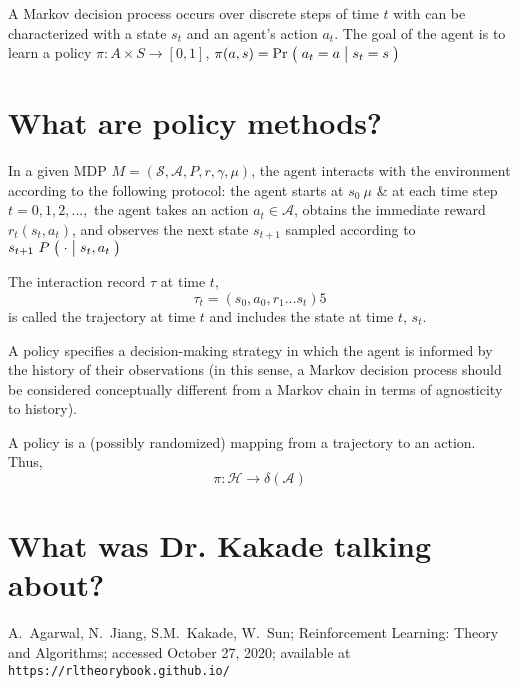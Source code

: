 \documentclass[12pt,reqno]{amsart}
\newcommand{\Cond}[2]{\bigm( {#1} \bigm\vert {#2}\bigm)}
\begin{document}
A Markov decision process occurs over discrete steps of time $t$ with can be characterized with a state $s_{t}$ and an agent's action $a_{t}$. The goal of the agent is to learn a policy $\pi: A \times S \rightarrow [0,1]$, $ \pi(a,s) = \Pr\Cond{a_{t} = a}{s_{t} = s} $
\section{What are policy methods?}
In a given MDP $M = (\mathcal{S},\mathcal{A}, P, r, \gamma, \mu)$, the agent interacts with the environment according to the following protocol: the agent starts at $s_{0} ~ \mu$ \& at each time step $t = 0,1,2,\ldots,$ the agent takes an action $a_{t} \in \mathcal{A}$, obtains the immediate reward $r_{t}(s_{t},a_{t})$, and observes the next state $s_{t+1}$ sampled according to $s_{t+1} ~ P \Cond{\cdot}{s_{t},a_{t}}$

The interaction record $\tau$ at time $t$,
\begin{equation*}
\tau_{t} = (s_{0},a_{0},r_{1} \ldots s_{t})5
\end{equation*}
is called the trajectory at time $t$ and includes the state at time $t$, $s_{t}$.

A policy specifies a decision-making strategy in which the agent is informed by the history of their observations (in this sense, a Markov decision process should be considered conceptually different from a Markov chain in terms of agnosticity to history). 

A policy is a (possibly randomized) mapping from a trajectory to an action. Thus,
\begin{equation*}
\pi: \mathcal{H} \rightarrow \delta(\mathcal{A})
\end{equation*}
\section{What was Dr. Kakade talking about?}



\begin{thebibliography}{99}

 A.\ Agarwal, N.\ Jiang, S.M.\ Kakade, W.\ Sun; Reinforcement Learning: Theory and Algorithms; accessed October 27, 2020; available at \texttt{https://rltheorybook.github.io/}
\end{thebibliography}
\end{document}
